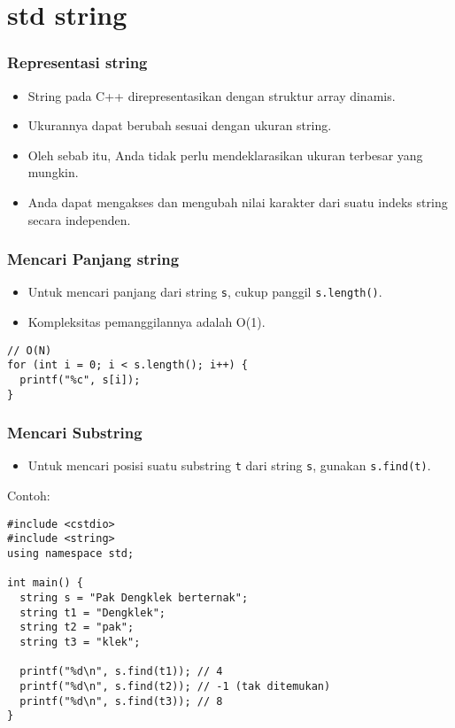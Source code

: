 \section{std string}
\frame{\sectionpage}

\begin{frame}[fragile]
\frametitle{Representasi string}
\begin{itemize}
  \item String pada C++ direpresentasikan dengan struktur array dinamis.
  \item Ukurannya dapat berubah sesuai dengan ukuran string.
  \item Oleh sebab itu, Anda tidak perlu mendeklarasikan ukuran terbesar yang mungkin.
  \item Anda dapat mengakses dan mengubah nilai karakter dari suatu indeks string secara independen.
\end{itemize}
\end{frame}

\begin{frame}[fragile]
\frametitle{Mencari Panjang string}
\begin{itemize}
  \item Untuk mencari panjang dari string \texttt{s}, cukup panggil \texttt{s.length()}.
  \item Kompleksitas pemanggilannya adalah O(1).
\end{itemize}
\begin{lstlisting}
// O(N)
for (int i = 0; i < s.length(); i++) {
  printf("%c", s[i]);
}
\end{lstlisting}
\end{frame}

\begin{frame}[fragile]
\frametitle{Mencari Substring}
\begin{itemize}
  \item Untuk mencari posisi suatu substring \texttt{t} dari string \texttt{s}, gunakan \texttt{s.find(t)}.
\end{itemize}
Contoh:
\begin{lstlisting}
#include <cstdio>
#include <string>
using namespace std;

int main() {
  string s = "Pak Dengklek berternak";
  string t1 = "Dengklek";
  string t2 = "pak";
  string t3 = "klek";

  printf("%d\n", s.find(t1)); // 4
  printf("%d\n", s.find(t2)); // -1 (tak ditemukan)
  printf("%d\n", s.find(t3)); // 8
}
\end{lstlisting}
\end{frame}

